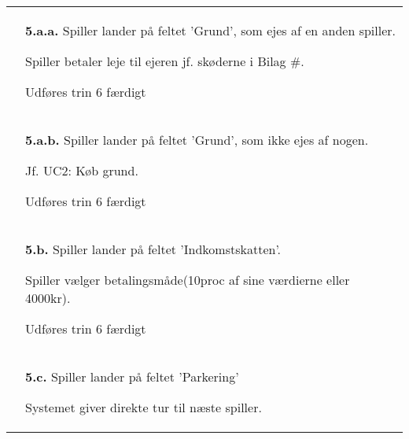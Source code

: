 \documentclass[class=article, crop=false]{standalone}
\begin{document}
\begin{table}[H]
\begin{tabularx}{\textwidth}{|l|X|}
                              & \textbf{5.a.a.} Spiller lander på feltet
                                'Grund', som ejes af en anden spiller.
                                \begin{enumerate} \begin{tabenum}
                                  \item Spiller betaler leje til ejeren
                                        jf. skøderne i Bilag \#.
                                  \item Udføres trin 6 færdigt
                                \end{tabenum} \end{enumerate}
                                \\
                            & \textbf{5.a.b.} Spiller lander på feltet
                                'Grund', som ikke ejes af nogen.
                            \begin{enumerate} \begin{tabenum}
                                  \item Jf. UC2: Køb grund.
                                  \item Udføres trin 6 færdigt
                            \end{tabenum} \end{enumerate}
                            \\
                            & \textbf{5.b.} Spiller lander på feltet
                            'Indkomstskatten'.
                            \begin{enumerate} \begin{tabenum}
                              \item Spiller vælger betalingsmåde(10proc af sine værdierne eller 4000kr).
                              \item Udføres trin 6 færdigt
                            \end{tabenum} \end{enumerate}
                            \\


                            & \textbf{5.c.} Spiller lander på feltet 'Parkering'
                            \begin{enumerate} \begin{tabenum}
                                                  \item Systemet giver direkte tur til næste spiller.
                            \end{tabenum} \end{enumerate}
                            \\


\end{tabularx}
\end{table}
\end{document}

